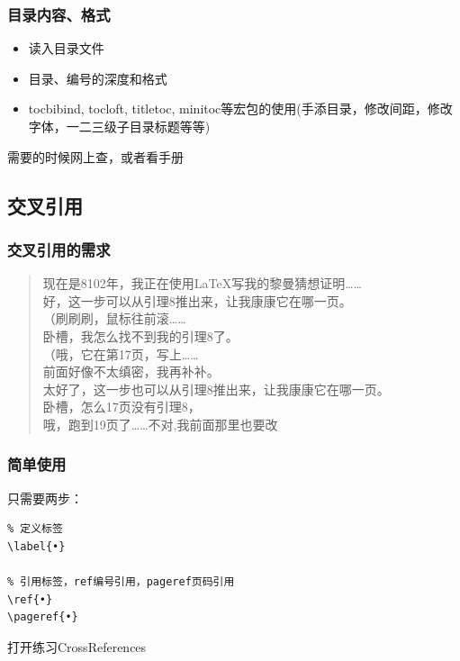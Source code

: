     \begin{frame}
        \frametitle{目录内容、格式}
        \begin{itemize}
            \item 读入目录文件
            \item 目录、编号的深度和格式
            \item tocbibind, tocloft, titletoc, minitoc等宏包的使用(手添目录，修改间距，修改字体，一二三级子目录标题等等)
        \end{itemize}
        需要的时候网上查，或者看手册
    \end{frame}



\subsection{交叉引用}
    \begin{frame}
        \frametitle{交叉引用的需求}
        \begin{verse}
        现在是8102年，我正在使用\LaTeX 写我的黎曼猜想证明……\\
        好，这一步可以从引理8推出来，让我康康它在哪一页。\\
        （刷刷刷，鼠标往前滚……\\
        卧槽，我怎么找不到我的引理8了。\\
        （哦，它在第17页，写上……\\
        前面好像不太缜密，我再补补。\\
        太好了，这一步也可以从引理8推出来，让我康康它在哪一页。\\
        卧槽，怎么17页没有引理8，\\
        哦，跑到19页了……不对,我前面那里也要改\text{|($\circledS$\_\_$\circledS$)|}
        \end{verse}
    \end{frame}
    
    \begin{frame}[fragile]
        \frametitle{简单使用}
        只需要两步：
\begin{lstlisting}
% 定义标签
\label{•}

% 引用标签，ref编号引用，pageref页码引用
\ref{•}
\pageref{•} 
\end{lstlisting}
        打开练习CrossReferences
    \end{frame}
    
